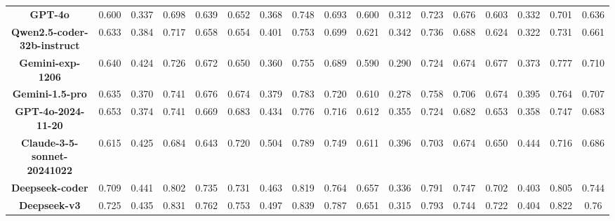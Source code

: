 \begin{table*}[t]
{\begin{tabular}{ccccccccccccccccc}
\textbf{GPT-4o} & 0.600 & 0.337 & 0.698 & 0.639 & 0.652 & 0.368 & 0.748 & 0.693 & 0.600 & 0.312 & 0.723 & 0.676 & 0.603 & 0.332 & 0.701 & 0.636 \\
\textbf{Qwen2.5-coder-32b-instruct} & 0.633 & 0.384 & 0.717 & 0.658 & 0.654 & 0.401 & 0.753 & 0.699 & 0.621 & 0.342 & 0.736 & 0.688 & 0.624 & 0.322 & 0.731 & 0.661 \\
\textbf{Gemini-exp-1206} & 0.640 & 0.424 & 0.726 & 0.672 & 0.650 & 0.360 & 0.755 & 0.689 & 0.590 & 0.290 & 0.724 & 0.674 & 0.677 & 0.373 & 0.777 & 0.710 \\
\textbf{Gemini-1.5-pro} & 0.635 & 0.370 & 0.741 & 0.676 & 0.674 & 0.379 & 0.783 & 0.720 & 0.610 & 0.278 & 0.758 & 0.706 & 0.674 & 0.395 & 0.764 & 0.707 \\
\textbf{GPT-4o-2024-11-20} & 0.653 & 0.374 & 0.741 & 0.669 & 0.683 & 0.434 & 0.776 & 0.716 & 0.612 & 0.355 & 0.724 & 0.682 & 0.653 & 0.358 & 0.747 & 0.683 \\
\textbf{Claude-3-5-sonnet-20241022} & 0.615 & 0.425 & 0.684 & 0.643 & 0.720 & 0.504 & 0.789 & 0.749 & 0.611 & 0.396 & 0.703 & 0.674 & 0.650 & 0.444 & 0.716 & 0.686 \\
\textbf{Deepseek-coder} & 0.709 & 0.441 & 0.802 & 0.735 & 0.731 & 0.463 & 0.819 & 0.764 & 0.657 & 0.336 & 0.791 & 0.747 & 0.702 & 0.403 & 0.805 & 0.744 \\
\textbf{Deepseek-v3} & 0.725 & 0.435 & 0.831 & 0.762 & 0.753 & 0.497 & 0.839 & 0.787 & 0.651 & 0.315 & 0.793 & 0.744 & 0.722 & 0.404 & 0.822 & 0.76 \\

\bottomrule
\end{tabular}}
\label{tab:multitool-normal}
\end{table*}

